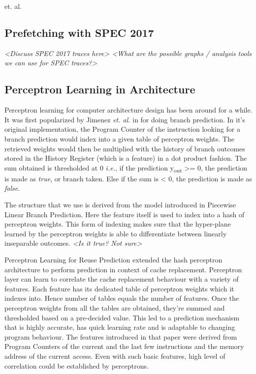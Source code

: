\documentclass{sig-alternate}
\begin{document}
et. al.
 
\subsection{Prefetching with SPEC 2017}
\textit{<Discuss SPEC 2017 traces here>
<What are the possible graphs / analysis tools we can use for SPEC traces?>}

\subsection{Perceptron Learning in Architecture}

Perceptron learning for computer architecture design has been around for a while. 
It was first popularized by Jimenez \textit{et. al.} in for doing branch prediction. \cite{Perc_Branch} 
In it's original implementation, the Program Counter of the instruction looking for a branch prediction would index into a given table of perceptron weights. 
The retrieved weights would then be multiplied with the history of branch outcomes stored in the History Register (which is a feature) in a dot product fashion. 
The sum obtained is thresholded at 0 \textit{i.e.}, if the prediction y\textsubscript{out} >= 0, the prediction is made as \textit{true}, or branch taken.
Else if the sum is < 0, the prediction is made as \textit{false}.

The structure that we use is derived from the model introduced in Piecewise Linear Branch Prediction\cite{Piece_Linear}. 
Here the feature itself is used to index into a hash of perceptron weights. 
This form of indexing makes sure that the hyper-plane learned by the perceptron weights is able to differentiate between linearly inseparable outcomes. 
\textit{<Is it true? Not sure>}

Perceptron Learning for Reuse Prediction\cite{Perc_Reuse} extended the hash perceptron architecture to perform prediction in context of cache replacement. 
Perceptron layer can learn to correlate the cache replacement behaviour with a variety of features. 
Each feature has its dedicated table of perceptron weights which it indexes into. 
Hence number of tables equals the number of features. 
Once the perceptron weights from all the tables are obtained, they're summed and thresholded based on a pre-decided value. 
This led to a prediction mechanism that is highly accurate, has quick learning rate and is adaptable to changing program behaviour. 
The features introduced in that paper were derived from Program Counters of the current and the last few instructions and the memory address of the current access. 
Even with such basic features, high level of correlation could be established by perceptrons. 
\end{document}
